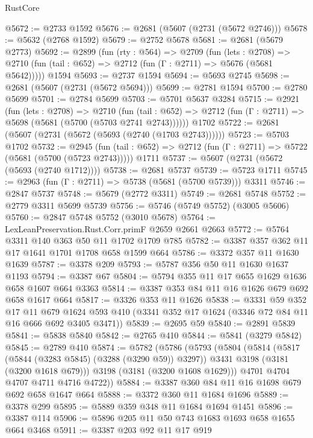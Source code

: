 \begin{lexlean}{RustCore}
\begin{coremodule}
@5672 := @2733 @1592
@5676 := @2681 (@5607 (@2731 (@5672 @2746)))
@5678 := @5632 (@2768 @1592)
@5679 := @2752 @5678
@5681 := @2681 (@5679 @2773)
@5692 := @2899
    (fun (rty : @564) =>
    @2709
      (fun (lets : @2708) =>
      @2710 (fun (tail : @652) => @2712 (fun (Γ : @2711) => @5676 (@5681 @5642)))))
    @1594
@5693 := @2737 @1594
@5694 := @5693 @2745
@5698 := @2681 (@5607 (@2731 (@5672 @5694)))
@5699 := @2781 @1594
@5700 := @2780 @5699
@5701 := @2784 @5699
@5703 := @5701 @5637 @3284
@5715 := @2921
    (fun (lets : @2708) =>
    @2710
      (fun (tail : @652) => @2712 (fun (Γ : @2711) => @5698 (@5681 (@5700 (@5703 @2741 @2743))))))
    @1702
@5722 := @2681 (@5607 (@2731 (@5672 (@5693 (@2740 (@1703 @2743))))))
@5723 := @5703 @1702
@5732 := @2945
    (fun (tail : @652) => @2712 (fun (Γ : @2711) => @5722 (@5681 (@5700 (@5723 @2743)))))
    @1711
@5737 := @5607 (@2731 (@5672 (@5693 (@2740 @1712))))
@5738 := @2681 @5737
@5739 := @5723 @1711
@5745 := @2963 (fun (Γ : @2711) => @5738 (@5681 (@5700 @5739))) @3311
@5746 := @2847 @5737
@5748 := @5679 (@2772 @3311)
@5749 := @2681 @5748
@5752 := @2779 @3311 @5699 @5739
@5756 := @5746 (@5749 @5752) (@3005 @5606)
@5760 := @2847 @5748 @5752 (@3010 @5678)
@5764 := LexLeanPreservation.Rust.Corr.primF @2659 @2661 @2663
@5772 := @5764 @3311 @140 @363 @50 @11 @1702 @1709 @785
@5782 := @3387 @357 @362 @11 @17 @1641 @1701 @1708 @658 @1599 @664
@5786 := @3372 @357 @11 @1630 @1639
@5787 := @3378 @209
@5793 := @5787 @356 @50 @11 @1630 @1637 @1193
@5794 := @3387 @67
@5804 := @5794 @355 @11 @17 @655 @1629 @1636 @658 @1607 @664 @3363
@5814 := @3387 @353 @84 @11 @16 @1626 @679 @692 @658 @1617 @664
@5817 := @3326 @353 @11 @1626
@5838 := @3331
    @59
    @352
    @17
    @11
    @679
    @1624
    @593
    @410
    (@3341 @352 @17 @1624 (@3346 @72 @84 @11 @16 @666 @692 @3405 @3471))
@5839 := @2695 @59
@5840 := @2891 @5839
@5841 := @5838 @5840
@5842 := @2765 @410
@5844 := @5841 (@3279 @5842)
@5845 := @2789 @410
@5874 := @5782
    (@5786
      (@5793
        (@5804
          (@5814
            (@5817 (@5844 (@3283 @5845) (@3288 (@3290 @59)) @3297))
            @3431
            @3198
            (@3181 (@3200 @1618 @679)))
          @3198
          (@3181 (@3200 @1608 @1629)))
        @4701
        @4704
        @4707
        @4711
        @4716
        @4722))
@5884 := @3387 @360 @84 @11 @16 @1698 @679 @692 @658 @1647 @664
@5888 := @3372 @360 @11 @1684 @1696
@5889 := @3378 @299
@5895 := @5889 @359 @348 @11 @1684 @1694 @1451
@5896 := @3387 @114
@5906 := @5896 @205 @11 @50 @743 @1683 @1693 @658 @1655 @664 @3468
@5911 := @3387 @203 @92 @11 @17 @919

\end{coremodule}
\end{lexlean}

